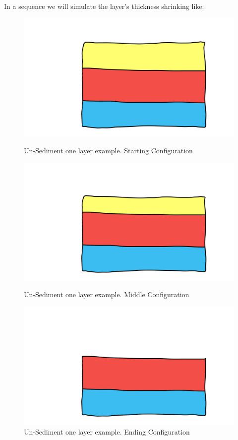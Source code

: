 \documentclass[12pt, a4paper]{report} %
\begin{document}
In a sequence we will simulate the layer's thickness shrinking like:
\begin{figure}[h]
    \begin{minipage}[c]{.50\linewidth}
        \centering
        \includegraphics[scale=0.2]{unSedimentDescription0.png}
	\caption{Un-Sediment one layer example. Starting Configuration}
    \end{minipage}
    \hfill%
    \begin{minipage}[c]{.50\linewidth}
        \centering
        \includegraphics[scale=0.2]{unSedimentDescription1.png}
	\caption{Un-Sediment one layer example. Middle Configuration}
    \end{minipage}
     \hfill%
    \begin{minipage}[c]{.50\linewidth}
        \centering
        \includegraphics[scale=0.2]{unSedimentDescription2.png}
	\caption{Un-Sediment one layer example. Ending Configuration}
    \end{minipage}
\end{figure}\\
\end{document}
